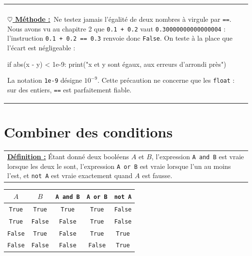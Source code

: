 \documentclass[a4paper,11pt,openany]{book}
\makeatletter
\newcommand{\code}[1]{\texttt{\textcolor{codebleu}{#1}}}
\newenvironment{cadre}%
 {\par\vspace{2mm}\noindent\begin{tabular}{|@{\hspace{4mm}}p{0.93\textwidth}@{\hspace{4mm}}|}
  \hline \\[-2mm]}%
 {\\[2mm] \hline \end{tabular}\par\vspace{3mm}}
\newcommand{\methode}{\textbf{\underline{$\heartsuit$ Méthode :}}~}
\renewcommand{\arraystretch}{1.4}
\makeatother
\begin{document}
\begin{cadre}
\methode Ne testez jamais l'égalité de deux nombres à virgule par \code{==}. Nous avons vu au chapitre 2 que \code{0.1 + 0.2} vaut \code{0.30000000000000004} : l'instruction \code{0.1 + 0.2 == 0.3} renvoie donc \code{False}. On teste à la place que l'écart est négligeable :
\begin{python}
if abs(x - y) < 1e-9:
    print("x et y sont égaux, aux erreurs d'arrondi près")
\end{python}
La notation \code{1e-9} désigne $10^{-9}$. Cette précaution ne concerne que les \code{float} : sur des entiers, \code{==} est parfaitement fiable.
\end{cadre}

\section{Combiner des conditions}

\begin{center}
\begin{tabularx}{15cm}{||X}
\noindent \textbf{\underline{Définition :}} Étant donné deux booléens $A$ et $B$, l'expression \code{A and B} est vraie lorsque les deux le sont, l'expression \code{A or B} est vraie lorsque l'un au moins l'est, et \code{not A} est vraie exactement quand $A$ est fausse.
\end{tabularx}
\end{center}

\begin{center}
\renewcommand{\arraystretch}{1.4}
\begin{tabular}{|c|c|c|c|c|}
\hline
\rowcolor{orange!50} $A$ & $B$ & \code{A and B} & \code{A or B} & \code{not A} \\
\hline
\code{True} & \code{True} & \code{True} & \code{True} & \code{False} \\
\hline
\code{True} & \code{False} & \code{False} & \code{True} & \code{False} \\
\hline
\code{False} & \code{True} & \code{False} & \code{True} & \code{True} \\
\hline
\code{False} & \code{False} & \code{False} & \code{False} & \code{True} \\
\hline
\end{tabular}
\end{center}
\end{document}
